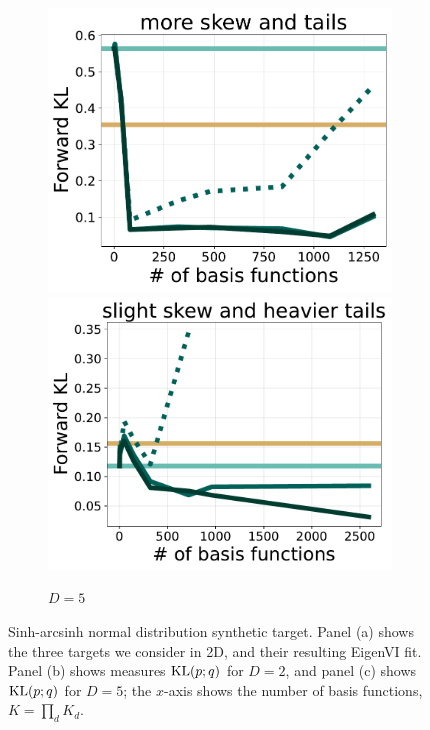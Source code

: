 \begin{figure}[t]
\begin{subfigure}[b]{\linewidth}
    \includegraphics[scale=0.21]{figs/expts-2d/sinh-5D-P2-new.pdf}
    \includegraphics[scale=0.21]{figs/expts-2d/sinh-5D-P3-new.pdf}
    \caption{$D=5$}
\label{subfig:sinh5D}
    \end{subfigure}
\caption{Sinh-arcsinh normal distribution synthetic target.
    Panel (a) shows the three targets we consider in 2D, and their resulting EigenVI fit.
    Panel (b) shows measures $\text{KL}(p;q)$ for $D=2$, and panel (c) shows $\text{KL}(p;q)$ for $D=5$;
    the $x$-axis shows the number of basis functions, $K\!=\!\prod_d K_d$.
    }
\vspace{-12pt}
\label{fig:sinhexample}
\end{figure}


